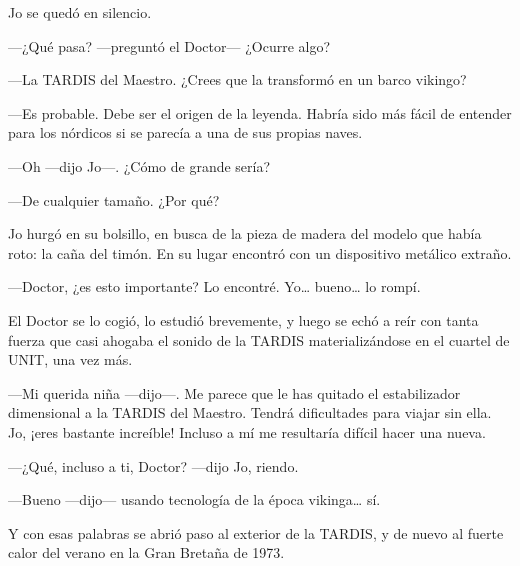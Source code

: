Jo se quedó en silencio.

---¿Qué pasa? ---preguntó el Doctor--- ¿Ocurre algo?

---La TARDIS del Maestro. ¿Crees que la transformó en un barco vikingo?

---Es probable. Debe ser el origen de la leyenda. Habría sido más fácil
de entender para los nórdicos si se parecía a una de sus propias naves.

---Oh ---dijo Jo---. ¿Cómo de grande sería?

---De cualquier tamaño. ¿Por qué?

Jo hurgó en su bolsillo, en busca de la pieza de madera del modelo que
había roto: la caña del timón. En su lugar encontró con un dispositivo
metálico extraño.

---Doctor, ¿es esto importante? Lo encontré. Yo\ldots{} bueno\ldots{} lo
rompí.

El Doctor se lo cogió, lo estudió brevemente, y luego se echó a reír con
tanta fuerza que casi ahogaba el sonido de la TARDIS materializándose en
el cuartel de UNIT, una vez más.

---Mi querida niña ---dijo---. Me parece que le has quitado el
estabilizador dimensional a la TARDIS del Maestro. Tendrá dificultades
para viajar sin ella. Jo, ¡eres bastante increíble! Incluso a mí me
resultaría difícil hacer una nueva.

---¿Qué, incluso a ti, Doctor? ---dijo Jo, riendo.

---Bueno ---dijo--- usando tecnología de la época vikinga\ldots{} sí.

Y con esas palabras se abrió paso al exterior de la TARDIS, y de nuevo
al fuerte calor del verano en la Gran Bretaña de 1973.